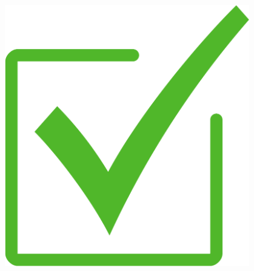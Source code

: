 \documentclass{beamer}
\begin{document}
\begin{frame}
	\pause
	\vspace{-110pt}
	\begin{columns}
		\begin{column}{.5\textwidth}
		\end{column}
		\begin{column}{.5\textwidth}
			\begin{figure}
				\centering
				\hspace{20pt} \includegraphics[width=.4\textwidth]{images/check.png}
			\end{figure}
		\end{column}
	\end{columns}

\end{frame}

\end{document}
